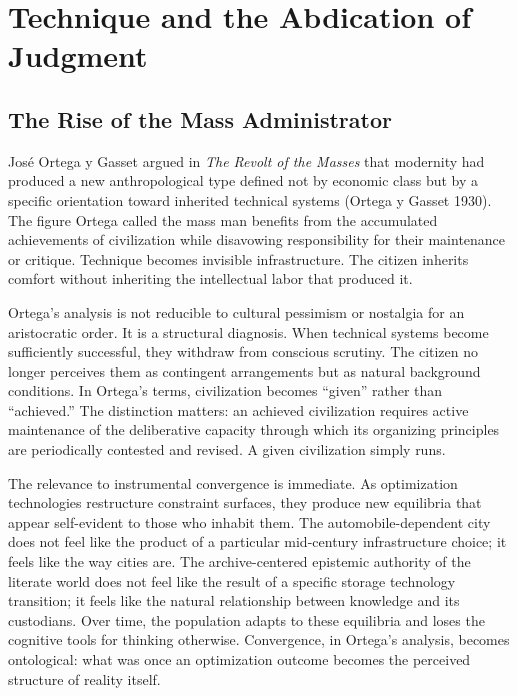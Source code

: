 \documentclass[12pt, oneside]{book}
\theoremstyle{plain}
\theoremstyle{definition}
\theoremstyle{remark}
\theoremstyle{definition}
\begin{document}
\chapter{Technique and the Abdication of Judgment}
\label{ch:ortega}

\section{The Rise of the Mass Administrator}

Jos\'e Ortega y Gasset argued in \textit{The Revolt of the Masses} that modernity
had produced a new anthropological type defined not by economic class but by a
specific orientation toward inherited technical systems (Ortega y Gasset 1930). The
figure Ortega called the mass man benefits from the accumulated achievements of
civilization while disavowing responsibility for their maintenance or critique.
Technique becomes invisible infrastructure. The citizen inherits comfort without
inheriting the intellectual labor that produced it.

Ortega's analysis is not reducible to cultural pessimism or nostalgia for an
aristocratic order. It is a structural diagnosis. When technical systems become
sufficiently successful, they withdraw from conscious scrutiny. The citizen no longer
perceives them as contingent arrangements but as natural background conditions. In
Ortega's terms, civilization becomes ``given'' rather than ``achieved.'' The
distinction matters: an achieved civilization requires active maintenance of the
deliberative capacity through which its organizing principles are periodically
contested and revised. A given civilization simply runs.

The relevance to instrumental convergence is immediate. As optimization technologies
restructure constraint surfaces, they produce new equilibria that appear self-evident
to those who inhabit them. The automobile-dependent city does not feel like the
product of a particular mid-century infrastructure choice; it feels like the way
cities are. The archive-centered epistemic authority of the literate world does not
feel like the result of a specific storage technology transition; it feels like the
natural relationship between knowledge and its custodians. Over time, the population
adapts to these equilibria and loses the cognitive tools for thinking otherwise.
Convergence, in Ortega's analysis, becomes ontological: what was once an optimization
outcome becomes the perceived structure of reality itself.
\end{document}
